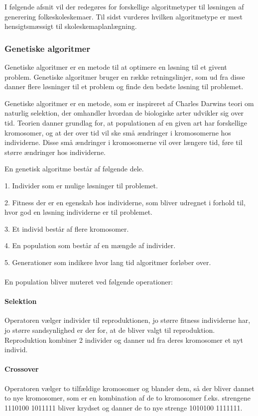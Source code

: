 I følgende afsnit vil der redegøres for forskellige algoritmetyper til løsningen af generering folkeskoleskemaer. Til sidst vurderes hvilken algoritmetype er mest hensigtsmæssigt til skoleskemaplanlægning.

\subsubsection{Genetiske algoritmer}
Genetiske algoritmer er en metode til at optimere en løsning til et givent problem. Genetiske algoritmer bruger en række retningslinjer, som ud fra disse danner flere løsninger til et problem og finde den bedste løsning til problemet.

Genetiske algoritmer er en metode, som er inspireret af Charles Darwins teori om naturlig selektion, der omhandler hvordan de biologiske arter udvikler sig over tid. Teorien danner grundlag for, at populationen af en given art har forskellige kromosomer, og at der over tid vil ske små ændringer i kromosomerne hos individerne. Disse små ændringer i kromosomerne vil over længere tid, føre til større ændringer hos individerne. 

En genetisk algoritme består af følgende dele.

1.	Individer som er mulige løsninger til problemet.

2.	Fitness der er en egenskab hos individerne, som bliver udregnet i forhold til, hvor god en løsning individerne er til 				problemet.

3.	Et individ består af flere kromosomer.

4.	En population som består af en mængde af individer.

5.	Generationer som indikere hvor lang tid algoritmer forløber over.
\\\\
En population bliver muteret ved følgende operationer:

\paragraph{Selektion}
Operatoren vælger individer til reproduktionen, jo større fitness individerne har, jo større sandsynlighed er der for, at de bliver valgt til reproduktion. Reproduktion kombiner 2 individer og danner ud fra deres kromosomer et nyt individ.

\paragraph{Crossover}
Operatoren vælger to tilfældige kromosomer og blander dem, så der bliver dannet to nye kromosomer, som er en kombination af de to kromosomer f.eks. strengene 1110100 1011111 bliver krydset og danner de to nye strenge 1010100 1111111.

